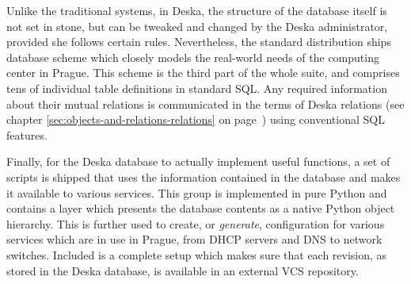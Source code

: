 \documentclass{article}
\begin{document}
Unlike the traditional systems, in Deska, the structure of the database itself is not set in stone, but can be tweaked
and changed by the Deska administrator, provided she follows certain rules.  Nevertheless, the standard distribution
ships database scheme which closely models the real-world needs of the computing center in Prague.  This scheme is the
third part of the whole suite, and comprises tens of individual table definitions in standard SQL.  Any required
information about their mutual relations is communicated in the terms of Deska relations (see chapter
\ref{sec:objects-and-relations-relations} on page~\pageref{sec:objects-and-relations-relations}) using conventional SQL
features.

Finally, for the Deska database to actually implement useful functions, a set of scripts is shipped that uses the
information contained in the database and makes it available to various services.  This group is implemented in pure
Python and contains a layer which presents the database contents as a native Python object hierarchy.  This is further
used to create, or {\em generate}, configuration for various services which are in use in Prague, from DHCP servers and
DNS to network switches.  Included is a complete setup which makes sure that each revision, as stored in the Deska
database, is available in an external VCS repository.
\end{document}
